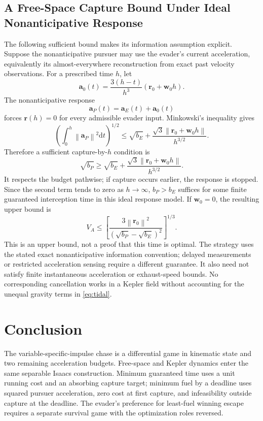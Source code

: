 \documentclass[journal,a4paper]{IEEEtran}
\newcommand{\norm}[1]{\left\|#1\right\|}
\newcommand{\dd}{\mathrm d}
\begin{document}
\subsection{A Free-Space Capture Bound Under Ideal Nonanticipative Response}
The following sufficient bound makes its information assumption explicit. Suppose the nonanticipative pursuer may use the evader's current acceleration, equivalently its almost-everywhere reconstruction from exact past velocity observations. For a prescribed time $h$, let
\begin{equation}
 \mathbf a_0(t)=\frac{3(h-t)}{h^3}(\mathbf r_0+\mathbf w_0h).
\end{equation}
The nonanticipative response
\begin{equation}
 \mathbf a_P(t)=\mathbf a_E(t)+\mathbf a_0(t)
 \label{eq:copystrategy}
\end{equation}
forces $\mathbf r(h)=0$ for every admissible evader input. Minkowski's inequality gives
\begin{equation}
 \left(\int_0^h\norm{\mathbf a_P}^2\dd t\right)^{1/2}
 \le\sqrt{b_E}+
       \frac{\sqrt3\norm{\mathbf r_0+\mathbf w_0h}}{h^{3/2}}.
\end{equation}
Therefore a sufficient capture-by-$h$ condition is
\begin{equation}
 \boxed{\sqrt{b_P}\ge\sqrt{b_E}
       +\frac{\sqrt3\norm{\mathbf r_0+\mathbf w_0h}}{h^{3/2}}.}
 \label{eq:copybound}
\end{equation}
It respects the budget pathwise; if capture occurs earlier, the response is stopped. Since the second term tends to zero as $h\to\infty$, $b_P>b_E$ suffices for some finite guaranteed interception time in this ideal response model. If $\mathbf w_0=0$, the resulting upper bound is
\begin{equation}
 V_A\le\left[\frac{3\norm{\mathbf r_0}^2}
                    {(\sqrt{b_P}-\sqrt{b_E})^2}\right]^{1/3}.
\end{equation}
This is an upper bound, not a proof that this time is optimal. The strategy uses the stated exact nonanticipative information convention; delayed measurements or restricted acceleration sensing require a different guarantee. It also need not satisfy finite instantaneous acceleration or exhaust-speed bounds. No corresponding cancellation works in a Kepler field without accounting for the unequal gravity terms in \eqref{eq:tidal}.

\section{Conclusion}
The variable-specific-impulse chase is a differential game in kinematic state and two remaining acceleration budgets. Free-space and Kepler dynamics enter the same separable Isaacs construction. Minimum guaranteed time uses a unit running cost and an absorbing capture target; minimum fuel by a deadline uses squared pursuer acceleration, zero cost at first capture, and infeasibility outside capture at the deadline. The evader's preference for least-fuel winning escape requires a separate survival game with the optimization roles reversed.
\end{document}
